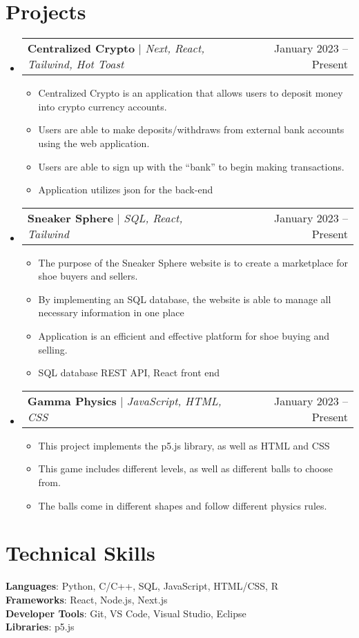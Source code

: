 \documentclass[letterpaper,11pt]{article}
\makeatletter
\newcommand{\resumeItem}[1]{
  \item\small{
    {#1 \vspace{-2pt}}
  }
}
\newcommand{\resumeProjectHeading}[2]{
    \item
    \begin{tabular*}{0.97\textwidth}{l@{\extracolsep{\fill}}r}
      \small#1 & #2 \\
    \end{tabular*}\vspace{-7pt}
}
\newcommand{\resumeSubHeadingListStart}{\begin{itemize}[leftmargin=0.15in, label={}]}
\newcommand{\resumeSubHeadingListEnd}{\end{itemize}}
\newcommand{\resumeItemListStart}{\begin{itemize}}
\newcommand{\resumeItemListEnd}{\end{itemize}\vspace{-5pt}}
\makeatother
\begin{document}
\section{Projects}
    \resumeSubHeadingListStart
      \resumeProjectHeading
          {\textbf{Centralized Crypto} $|$ \emph{Next, React, Tailwind, Hot Toast}}{January 2023 -- Present}
          \resumeItemListStart
            \resumeItem{Centralized Crypto is an application that allows users to deposit money into crypto currency accounts.}
            \resumeItem{Users are able to make deposits/withdraws from external bank accounts using the web application.}
            \resumeItem{Users are able to sign up with the “bank” to begin making transactions.}
            \resumeItem{Application utilizes json for the back-end}
          \resumeItemListEnd
      \resumeProjectHeading
          {\textbf{Sneaker Sphere} $|$ \emph{SQL, React, Tailwind}}{January 2023 -- Present}
          \resumeItemListStart
            \resumeItem{The purpose of the Sneaker Sphere website is to create a marketplace for shoe buyers and sellers.}
            \resumeItem{By implementing an SQL database, the website is able to manage all necessary information in one place}
            \resumeItem{Application is an efficient and effective platform for shoe buying and selling.}
            \resumeItem{SQL database REST API, React front end}
          \resumeItemListEnd
        \resumeProjectHeading
          {\textbf{Gamma Physics} $|$ \emph{JavaScript, HTML, CSS}}{January 2023 -- Present}
          \resumeItemListStart
            \resumeItem{This project implements the p5.js library, as well as HTML and CSS}
            \resumeItem{This game includes different levels, as well as different balls to choose from.}
            \resumeItem{The balls come in different shapes and follow different physics rules.}
          \resumeItemListEnd
    \resumeSubHeadingListEnd


%
\section{Technical Skills}
 \begin{itemize}[leftmargin=0.15in, label={}]
    \small{\item{
     \textbf{Languages}{: Python, C/C++, SQL, JavaScript, HTML/CSS, R} \\
     \textbf{Frameworks}{: React, Node.js, Next.js} \\
     \textbf{Developer Tools}{: Git, VS Code, Visual Studio, Eclipse} \\
     \textbf{Libraries}{: p5.js }
    }}
 \end{itemize}
\end{document}
